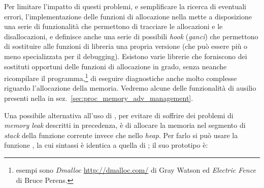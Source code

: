 

Per limitare l'impatto di questi problemi, e semplificare la ricerca di
eventuali errori, l'implementazione delle funzioni di allocazione nella
 mette a disposizione una serie di funzionalità che permettono di
tracciare le allocazioni e le disallocazioni, e definisce anche una serie di
possibili \textit{hook} (\textsl{ganci}) che permettono di sostituire alle
funzioni di libreria una propria versione (che può essere più o meno
specializzata per il debugging). Esistono varie librerie che forniscono dei
sostituti opportuni delle funzioni di allocazione in grado, senza neanche
ricompilare il programma,\footnote{esempi sono \textit{Dmalloc}
  \url{http://dmalloc.com/} di Gray Watson ed \textit{Electric Fence} di Bruce
  Perens.} di eseguire diagnostiche anche molto complesse riguardo
l'allocazione della memoria. Vedremo alcune delle funzionalità di ausilio
presenti nella  in sez.~\ref{sec:proc_memory_adv_management}.


Una possibile alternativa all'uso di , per evitare di soffrire
dei problemi di \textit{memory leak} descritti in precedenza, è di allocare la
memoria nel segmento di \textit{stack} della funzione corrente invece che
nello \textit{heap}. Per farlo si può usare la funzione , la cui
sintassi è identica a quella di ; il suo prototipo è:

